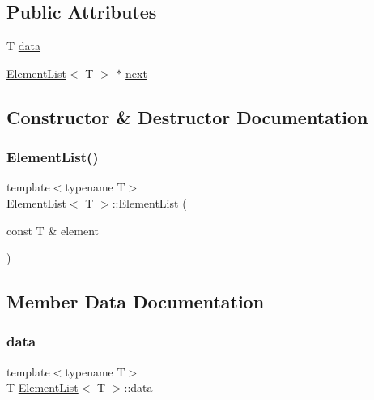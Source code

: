 \subsection*{Public Attributes}
\begin{DoxyCompactItemize}
\item 
T \mbox{\hyperlink{struct_element_list_a4c3bbe183d5a854d51e193b21075c884}{data}}
\item 
\mbox{\hyperlink{struct_element_list}{Element\+List}}$<$ T $>$ $\ast$ \mbox{\hyperlink{struct_element_list_ae15f34d3109949237cf3ba98a074d402}{next}}
\end{DoxyCompactItemize}


\subsection{Constructor \& Destructor Documentation}
\mbox{\label{struct_element_list_a2f2c3bfdd0cda10f2e50f8f04758b52a}} 
\subsubsection{\texorpdfstring{Element\+List()}{ElementList()}}
{\footnotesize\ttfamily template$<$typename T$>$ \\
\mbox{\hyperlink{struct_element_list}{Element\+List}}$<$ T $>$\+::\mbox{\hyperlink{struct_element_list}{Element\+List}} (\begin{DoxyParamCaption}\item[{const T \&}]{element }\end{DoxyParamCaption})\hspace{0.3cm}{\ttfamily [inline]}}



\subsection{Member Data Documentation}
\mbox{\label{struct_element_list_a4c3bbe183d5a854d51e193b21075c884}} 
\subsubsection{\texorpdfstring{data}{data}}
{\footnotesize\ttfamily template$<$typename T$>$ \\
T \mbox{\hyperlink{struct_element_list}{Element\+List}}$<$ T $>$\+::data}

